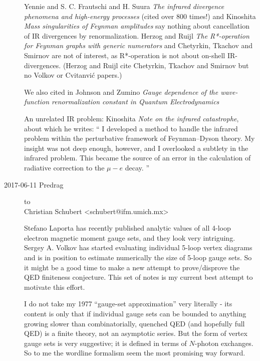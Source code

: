 \begin{description}
Yennie and S. C. Frautschi and H. Suura
{\em The infrared divergence phenomena and high-energy processes}
(cited over 800 times!) and
Kinoshita
{\em Mass singularities of {Feynman} amplitudes}
say nothing about cancellation of IR divergences by renormalization.
Herzog and Ruijl
{\em The {R*}-operation for {Feynman} graphs with generic numerators}
and Chetyrkin, Tkachov and
Smirnov
are not of interest, as {R*}-operation is not about on-shell IR-divergences.
 (Herzog and Ruijl cite Chetyrkin, Tkachov and
Smirnov but no Volkov or
Cvitanvi\'c papers.)

We also cited in 
Johnson and Zumino {\em Gauge dependence of the
wave-function renormalization constant in {Quantum Electrodynamics}}

An unrelated IR problem: Kinoshita {\em Note on the infrared
catastrophe}, about which he writes: ``
I developed a method to handle the infrared problem within the
perturbative framework of Feynman–Dyson theory. My
insight was not deep enough, however, and I overlooked a subtlety in the
infrared problem. This became the source of an error in the calculation
of radiative correction to the $\mu-e$ decay.
''


\item[2017-06-11 Predrag] to
\\
Christian Schubert <schubert@ifm.umich.mx>
%
%

Stefano Laporta  has recently published analytic values of all 4-loop
electron magnetic moment gauge sets, and they look very intriguing.
Sergey  A. Volkov has started evaluating individual 5-loop vertex
diagrams and is in position to estimate numerically the size of 5-loop
gauge sets. So it might be a good time to make a new attempt to prove/disprove
the QED finiteness conjecture. This set of notes is my current best attempt
to motivate this effort.

I do not take my 1977 ``gauge-set approximation'' very literally - its
content is only that if individual gauge sets can be bounded to anything
growing slower than combinatorially, quenched QED (and hopefully full
QED) is a finite theory, not an asymptotic series. But the form of vertex
gauge sets is very suggestive; it is defined in terms of $N$-photon
exchanges. So to me the wordline formalism seem the most promising way
forward.


\end{description}
